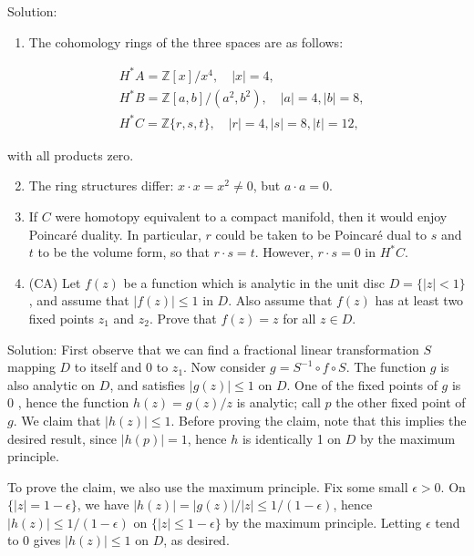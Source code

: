 \documentclass[10pt]{article}
\begin{document}
Solution:

\begin{enumerate}
  \item The cohomology rings of the three spaces are as follows:
\end{enumerate}

$$
\begin{aligned}
& H^{*} A=\mathbb{Z}[x] / x^{4}, \quad|x|=4, \\
& H^{*} B=\mathbb{Z}[a, b] /\left(a^{2}, b^{2}\right), \quad|a|=4,|b|=8, \\
& H^{*} C=\mathbb{Z}\{r, s, t\}, \quad|r|=4,|s|=8,|t|=12,
\end{aligned}
$$

with all products zero.

\begin{enumerate}
  \setcounter{enumi}{1}
  \item The ring structures differ: $x \cdot x=x^{2} \neq 0$, but $a \cdot a=0$.

  \item If $C$ were homotopy equivalent to a compact manifold, then it would enjoy Poincaré duality. In particular, $r$ could be taken to be Poincaré dual to $s$ and $t$ to be the volume form, so that $r \cdot s=t$. However, $r \cdot s=0$ in $H^{*} C$.

  \item (CA) Let $f(z)$ be a function which is analytic in the unit disc $D=\{|z|<1\}$, and assume that $|f(z)| \leq 1$ in $D$. Also assume that $f(z)$ has at least two fixed points $z_{1}$ and $z_{2}$. Prove that $f(z)=z$ for all $z \in D$.

\end{enumerate}

Solution: First observe that we can find a fractional linear transformation $S$ mapping $D$ to itself and 0 to $z_{1}$. Now consider $g=S^{-1} \circ f \circ S$. The function $g$ is also analytic on $D$, and satisfies $|g(z)| \leq 1$ on $D$. One of the fixed points of $g$ is 0 , hence the function $h(z)=g(z) / z$ is analytic; call $p$ the other fixed point of $g$. We claim that $|h(z)| \leq 1$. Before proving the claim, note that this implies the desired result, since $|h(p)|=1$, hence $h$ is identically 1 on $D$ by the maximum principle.

To prove the claim, we also use the maximum principle. Fix some small $\epsilon>0$. On $\{|z|=1-\epsilon\}$, we have $|h(z)|=|g(z)| /|z| \leq 1 /(1-\epsilon)$, hence $|h(z)| \leq 1 /(1-\epsilon)$ on $\{|z| \leq 1-\epsilon\}$ by the maximum principle. Letting $\epsilon$ tend to 0 gives $|h(z)| \leq 1$ on $D$, as desired.
\end{document}
